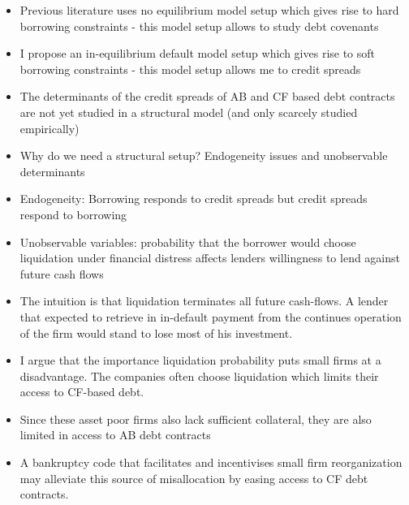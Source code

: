 \documentclass[12pt]{article}
\begin{document}
\begin{itemize}\setlength\itemsep{0em} \small
    \item Previous literature uses no equilibrium model setup which gives rise to hard borrowing constraints - this model setup allows to study debt covenants
    \item I propose an in-equilibrium default model setup which gives rise to soft borrowing constraints - this model setup allows me to credit spreads 
    \item The determinants of the credit spreads of AB and CF based debt contracts are not yet studied in a structural model (and only scarcely studied empirically)
    \item Why do we need a structural setup? Endogeneity issues and unobservable determinants
    \item Endogeneity: Borrowing responds to credit spreads but credit spreads respond to borrowing
    \item Unobservable variables: probability that the borrower would choose liquidation under financial distress affects lenders willingness to lend against future cash flows
    \item The intuition is that liquidation terminates all future cash-flows. A lender that expected to retrieve in in-default payment from the continues operation of the firm would stand to lose most of his investment. 
    \item I argue that the importance liquidation probability puts small firms at a disadvantage. The companies often choose liquidation which limits their access to CF-based debt. 
    \item Since these asset poor firms also lack sufficient collateral, they are also limited in access to AB debt contracts
    \item A bankruptcy code that facilitates and incentivises small firm reorganization may alleviate this source of misallocation by easing access to CF debt contracts. 
\end{itemize} \normalsize


\newpage
\end{document}
